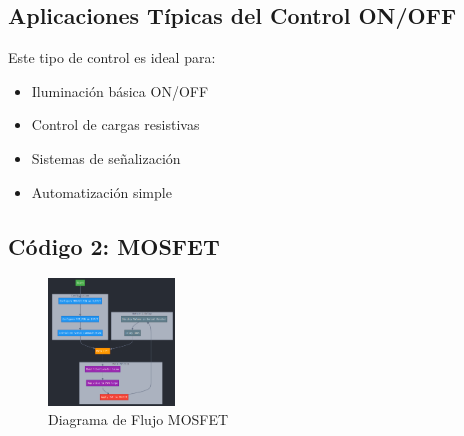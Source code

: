\subsection{Aplicaciones Típicas del Control ON/OFF}
Este tipo de control es ideal para:
\begin{itemize}
	\item Iluminación básica ON/OFF
	\item Control de cargas resistivas
	\item Sistemas de señalización
	\item Automatización simple
\end{itemize}

\subsection{Código 2: MOSFET}
\begin{figure}[H]
	\centering
	\includegraphics[width=0.3\textwidth]{images/flujom}
	\caption{Diagrama de Flujo MOSFET}
	\label{fig:flujomosfet}
\end{figure}

